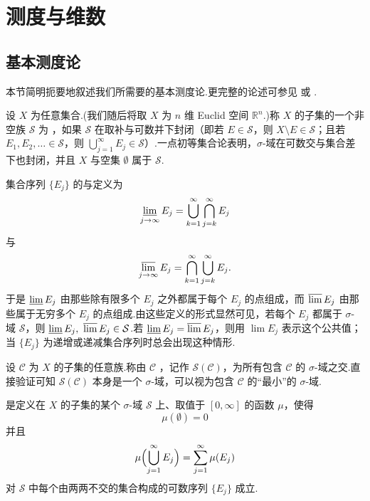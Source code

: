 
\chapter{测度与维数}

\section{基本测度论}

本节简明扼要地叙述我们所需要的基本测度论.更完整的论述可参见 \textcite{kingmantaylor1966} 或 \textcite{rogers1970}.

设 $X$ 为任意集合.(我们随后将取 $X$ 为 $n$ 维 Euclid 空间 $\mathbb{R}^n$.)称 $X$ 的子集的一个非空族 $\mathcal{S}$ 为 ，如果 $\mathcal{S}$ 在取补与可数并下封闭（即若 $E\in\mathcal{S}$，则 $X\setminus E\in\mathcal{S}$；且若 $E_1,E_2,\ldots\in\mathcal{S}$，则 $\bigcup_{j=1}^{\infty}E_j\in\mathcal{S}$）.一点初等集合论表明，$\sigma$-域在可数交与集合差下也封闭，并且 $X$ 与空集 $\emptyset$ 属于 $\mathcal{S}$.

集合序列 $\{E_j\}$ 的与定义为
\[
  \varliminf_{j\to\infty}E_j=\bigcup_{k=1}^{\infty}\bigcap_{j=k}^{\infty}E_j
\]
与
\[
  \varlimsup_{j\to\infty}E_j=\bigcap_{k=1}^{\infty}\bigcup_{j=k}^{\infty}E_j.
\]
于是 $\varliminf E_j$ 由那些除有限多个 $E_j$ 之外都属于每个 $E_j$ 的点组成，而 $\varlimsup E_j$ 由那些属于无穷多个 $E_j$ 的点组成.由这些定义的形式显然可见，若每个 $E_j$ 都属于 $\sigma$-域 $\mathcal{S}$，则 $\varliminf E_j,\ \varlimsup E_j\in\mathcal{S}$.若 $\varliminf E_j=\varlimsup E_j$，则用 $\lim E_j$ 表示这个公共值；当 $\{E_j\}$ 为递增或递减集合序列时总会出现这种情形.

设 $\mathcal{C}$ 为 $X$ 的子集的任意族.称由 $\mathcal{C}$ ，记作 $\mathcal{S}(\mathcal{C})$，为所有包含 $\mathcal{C}$ 的 $\sigma$-域之交.直接验证可知 $\mathcal{S}(\mathcal{C})$ 本身是一个 $\sigma$-域，可以视为包含 $\mathcal{C}$ 的``最小''的 $\sigma$-域.

是定义在 $X$ 的子集的某个 $\sigma$-域 $\mathcal{S}$ 上、取值于 $[0,\infty]$ 的函数 $\mu$，使得
\begin{equation}\label{eq:1.1}
  \mu(\emptyset)=0
\end{equation}
并且
\begin{equation}\label{eq:1.2}
  \mu\Bigl(\bigcup_{j=1}^{\infty}E_j\Bigr)=\sum_{j=1}^{\infty}\mu(E_j)
\end{equation}
对 $\mathcal{S}$ 中每个由两两不交的集合构成的可数序列 $\{E_j\}$ 成立.


